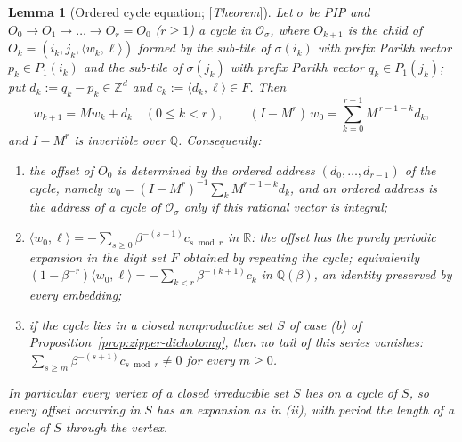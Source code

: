 \documentclass[11pt]{amsart}
\theoremstyle{plain}
\newtheorem{lemma}[theorem]{Lemma}
\theoremstyle{definition}
\theoremstyle{remark}
\newcommand{\Z}{\mathbb{Z}}
\newcommand{\Q}{\mathbb{Q}}
\newcommand{\R}{\mathbb{R}}
\newcommand{\Status}[1]{\textup{[\textit{#1}]}}
\begin{document}
\begin{lemma}[Ordered cycle equation; \Status{Theorem}]\label{lem:ordered-cycle}
Let $\sigma$ be PIP and $O_0\to O_1\to\dots\to O_r=O_0$ ($r\ge1$) a cycle in $\mathcal O_\sigma$, where $O_{k+1}$ is the child of $O_k=(i_k,j_k,\langle w_k,\ell\rangle)$ formed by the sub-tile of $\sigma(i_k)$ with prefix Parikh vector $p_k\in P_1(i_k)$ and the sub-tile of $\sigma(j_k)$ with prefix Parikh vector $q_k\in P_1(j_k)$; put $d_k:=q_k-p_k\in\Z^d$ and $c_k:=\langle d_k,\ell\rangle\in F$. Then
\[
w_{k+1}=Mw_k+d_k\quad(0\le k<r),\qquad (I-M^r)\,w_0=\sum_{k=0}^{r-1}M^{\,r-1-k}d_k,
\]
and $I-M^r$ is invertible over $\Q$. Consequently:
\begin{enumerate}[label=\textup{(\roman*)},leftmargin=*]
\item the offset of $O_0$ is determined by the ordered address $(d_0,\dots,d_{r-1})$ of the cycle, namely $w_0=(I-M^r)^{-1}\sum_kM^{r-1-k}d_k$, and an ordered address is the address of a cycle of $\mathcal O_\sigma$ only if this rational vector is integral;
\item $\langle w_0,\ell\rangle=-\sum_{s\ge0}\beta^{-(s+1)}c_{s\bmod r}$ in $\R$: the offset has the purely periodic expansion in the digit set $F$ obtained by repeating the cycle; equivalently $(1-\beta^{-r})\langle w_0,\ell\rangle=-\sum_{k<r}\beta^{-(k+1)}c_k$ in $\Q(\beta)$, an identity preserved by every embedding;
\item if the cycle lies in a closed nonproductive set $S$ of case \textup{(b)} of Proposition~\ref{prop:zipper-dichotomy}, then no tail of this series vanishes: $\sum_{s\ge m}\beta^{-(s+1)}c_{s\bmod r}\ne0$ for every $m\ge0$.
\end{enumerate}
In particular every vertex of a closed irreducible set $S$ lies on a cycle of $S$, so every offset occurring in $S$ has an expansion as in \textup{(ii)}, with period the length of a cycle of $S$ through the vertex.
\end{lemma}
\end{document}
